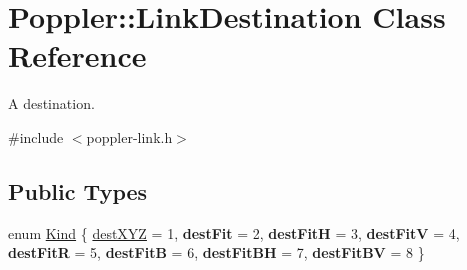 \hypertarget{class_poppler_1_1_link_destination}{}\section{Poppler\+:\+:Link\+Destination Class Reference}
\label{class_poppler_1_1_link_destination}


A destination.  




{\ttfamily \#include $<$poppler-\/link.\+h$>$}

\subsection*{Public Types}
\begin{DoxyCompactItemize}
\item 
enum \hyperlink{class_poppler_1_1_link_destination_a97a2b266fbd0c48fc0189269b9941810}{Kind} \{ \newline
\hyperlink{class_poppler_1_1_link_destination_a97a2b266fbd0c48fc0189269b9941810af45093b1c3d3a5e52c779416d62934f5}{dest\+X\+YZ} = 1, 
{\bfseries dest\+Fit} = 2, 
{\bfseries dest\+FitH} = 3, 
{\bfseries dest\+FitV} = 4, 
\newline
{\bfseries dest\+FitR} = 5, 
{\bfseries dest\+FitB} = 6, 
{\bfseries dest\+Fit\+BH} = 7, 
{\bfseries dest\+Fit\+BV} = 8
 \}
\end{DoxyCompactItemize}

